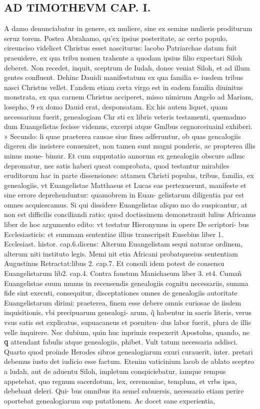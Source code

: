 \documentclass{article}
\begin{document}
\begin{pages}
\section*{AD TIMOTHEVM CAP. I. }
\marginpar{[ p.14 ]}\pstart A damo denunciabatur in genere, ex muliere, sine ex semine mulieris proditurum seruz torem. Postea Abrahamo, qu’ex ipsius posteritate, ac certo populo, cireunciso videlicet Christus esset nasciturus: lacobo Patriarchae datum fuit praeuidere, ex qua tribu nomen trahente a quodam ipsius filio expectari Siloh deberet. Non recedet, inquit, sceptrum de Iudah, donec veniat Siloh, et ad illum gentes confluent. Dehinc Dauidi manifestatum ex qua familia e- iusdem tribus nasci Christus vellet. I’andem etiam certa virgo est in eadem familia diuinitus monstrata, ex qua carnem Christus acciperet, misso nimirum Angelo ad Mariam, losepho, 9 ex domo Dauid erat, desponsatam. Ex his autem liquet, quam necessarium fuerit, genealogiam Chr sti ex libris veteris testamenti, quemadmo dum Euangelistas fecisse videmus, excerpi atque  Gmlbus cegnorceiuainl exhiberi.  \pend\pstart » Secundo: li quae praeterea causae siue fines adferuntur, ob quas gencalogiis digeren dis insistere conueniret, non tamen sunt magni ponderis, ac propterea illis minus moue- bimur. Et cum supputatio annorum ex genealogiis obscure adhuc depromatur, nec satis haberi queat comprobata, quod testantur mirabiles eruditorum hac in parte dissensiones: attamen Christi populus, tribus, familia, ex genealogiis, vt Euangelistae Matthaeus et Lucas eas pertexuerunt, manifeste et sine errore deprehenduntur: quamobrem in Euan- gelistarum diligentia par est omnes acquiescamus. Si qui dissidere Euangelistas aliquo mo do suspicantur, at non est difficilis conciliandi ratio: quod doctissimem demonstrauit lulius Africanus liber  de hoc argumento edito: vt testatur Hieronymus in opere De scriptori- bus Ecclesiasticis: et summam sententiae illius transcripsit Eusebius liber 1. Ecclesiast. histor. cap.6.dicens: Alterum Euangelistam sequi naturae ordinem, alterum niti instituto legis. Memi nit etia Africani probatqueeius sententiam Augustinus Retractat:libus 2. cap.7. Et consuli idem potest de consensu Euangelistarum lib2. cap.4. Contra faustum Manichaeum liber 3. et4. Cumañ Euangelistae suum munus in recensendis genealogiis cognitu necessariis, summa fide sint executi, consequitur, disceptationes omnes de genealogiis autoritate Euangelistarum dirimi: praeterea, finem esse debere omnis curiosae de iisdem inquisitionis, vbi precipuarum genealogi- arum, q̃ habentur in sacris literis, verus vsus satis est explicatus, supuacaneus et poeniten- dus labor fuerit, plura de illis velle inquirere. Nec dubium, quin huc inprimis respexerit Apostolus, quando, ne ꝗ attendant fabulis atque  genealogiis, phibet. Vult tatum necessaria addisci. Quarto quod proinde Herodes sibros genealogiarum exuri curauerit, inter. pretari debemus iusto det iudicio esse factum. Etenim vaticinium lacob de ablato sceptro a ludah, aut de aduentu Siloh, impletum conspiciebatur, iamque  rempus appetebat, quo regnum sacerdotum, lex, ceremoniae, templum, et vrbs ipsa, debebant deleri. Qui- bus omnibus ita semel subuersis, necessario etiam perire oportebat genealogiarum sup putatlonem. Ac docet sane experientia, 
\end{pages}
\end{document}

